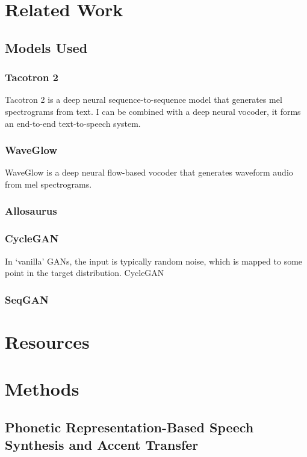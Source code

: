 \documentclass[12pt,leqno,a4paper]{article}
\begin{document}
\section{Related Work}
\subsection{Models Used}
\subsubsection{Tacotron 2}
Tacotron 2 is a deep neural sequence-to-sequence model that generates mel spectrograms from text. 
I can be combined with a deep neural vocoder, it forms an end-to-end text-to-speech system.
\subsubsection{WaveGlow}
WaveGlow is a deep neural flow-based vocoder that generates waveform audio from mel spectrograms.
\subsubsection{Allosaurus}

\subsubsection{CycleGAN}
In `vanilla' GANs, the input is typically random noise, which is mapped to some point in the target distribution. 
CycleGAN

\subsubsection{SeqGAN}



\section{Resources}

\newpage
\section{Methods}

\subsection{Phonetic Representation-Based Speech Synthesis and Accent Transfer}
%

\end{document}
